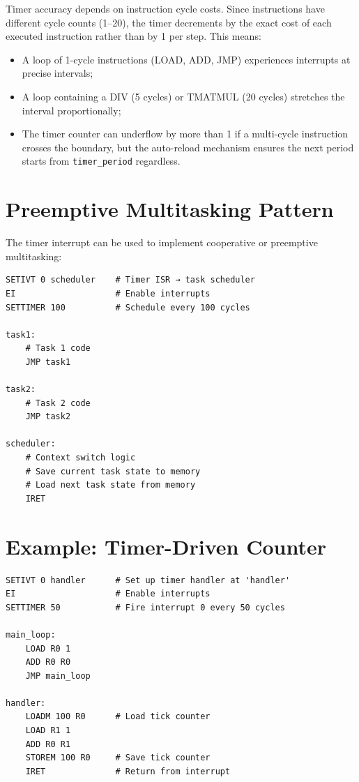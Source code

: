 \documentclass[10pt,a4paper,twoside]{book}
\begin{document}
Timer accuracy depends on instruction cycle costs. Since instructions have different
cycle counts (1--20), the timer decrements by the exact cost of each executed
instruction rather than by 1 per step. This means:
\begin{itemize}
    \item A loop of 1-cycle instructions (LOAD, ADD, JMP) experiences interrupts at
          precise intervals;
    \item A loop containing a DIV (5 cycles) or TMATMUL (20 cycles) stretches the
          interval proportionally;
    \item The timer counter can underflow by more than 1 if a multi-cycle instruction
          crosses the boundary, but the auto-reload mechanism ensures the next period
          starts from \texttt{timer\_period} regardless.
\end{itemize}

\section{Preemptive Multitasking Pattern}

The timer interrupt can be used to implement cooperative or preemptive multitasking:

\begin{lstlisting}
SETIVT 0 scheduler    # Timer ISR → task scheduler
EI                    # Enable interrupts
SETTIMER 100          # Schedule every 100 cycles

task1:
    # Task 1 code
    JMP task1

task2:
    # Task 2 code
    JMP task2

scheduler:
    # Context switch logic
    # Save current task state to memory
    # Load next task state from memory
    IRET
\end{lstlisting}

\section{Example: Timer-Driven Counter}

\begin{lstlisting}
SETIVT 0 handler      # Set up timer handler at 'handler'
EI                    # Enable interrupts
SETTIMER 50           # Fire interrupt 0 every 50 cycles

main_loop:
    LOAD R0 1
    ADD R0 R0
    JMP main_loop

handler:
    LOADM 100 R0      # Load tick counter
    LOAD R1 1
    ADD R0 R1
    STOREM 100 R0     # Save tick counter
    IRET              # Return from interrupt
\end{lstlisting}
\end{document}
